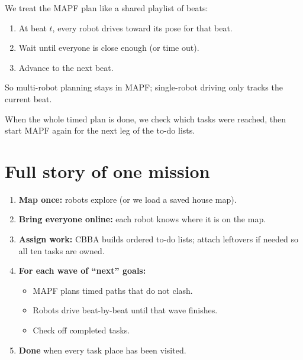 \documentclass[11pt,a4paper]{article}
\begin{document}
We treat the MAPF plan like a shared playlist of beats:
\begin{enumerate}[leftmargin=*]
  \item At beat $t$, every robot drives toward its pose for that beat.
  \item Wait until everyone is close enough (or time out).
  \item Advance to the next beat.
\end{enumerate}

So multi-robot planning stays in MAPF; single-robot driving only tracks the
current beat.

When the whole timed plan is done, we check which tasks were reached, then
start MAPF again for the next leg of the to-do lists.

\section{Full story of one mission}

\begin{enumerate}[leftmargin=*]
  \item \textbf{Map once:} robots explore (or we load a saved house map).
  \item \textbf{Bring everyone online:} each robot knows where it is on the map.
  \item \textbf{Assign work:} CBBA builds ordered to-do lists; attach leftovers
        if needed so all ten tasks are owned.
  \item \textbf{For each wave of ``next'' goals:}
        \begin{itemize}
          \item MAPF plans timed paths that do not clash.
          \item Robots drive beat-by-beat until that wave finishes.
          \item Check off completed tasks.
        \end{itemize}
  \item \textbf{Done} when every task place has been visited.
\end{enumerate}
\end{document}
